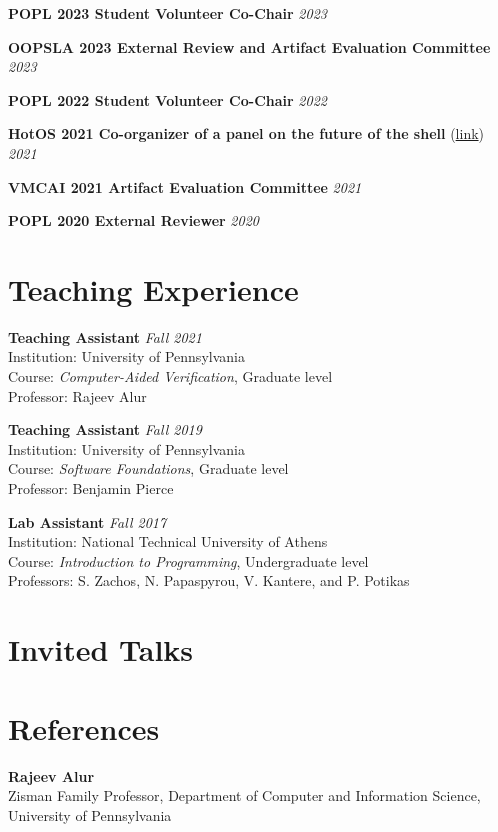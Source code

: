 \documentclass[margin]{res}
\begin{document}
\begin{resume}
\textbf{POPL 2023 Student Volunteer Co-Chair}  \hfill {\em 2023}

\textbf{OOPSLA 2023 External Review and Artifact Evaluation Committee}  \hfill {\em 2023}

\textbf{POPL 2022 Student Volunteer Co-Chair}  \hfill {\em 2022}

\textbf{HotOS 2021 Co-organizer of a panel on the future of the shell} (\href{https://fut-shell.github.io/}{link})  \hfill {\em 2021}

\textbf{VMCAI 2021 Artifact Evaluation Committee}  \hfill {\em 2021}

\textbf{POPL 2020 External Reviewer}  \hfill {\em 2020}

\section{Teaching Experience}

\textbf{Teaching Assistant}  \hfill {\em Fall 2021} \\
Institution: University of Pennsylvania \\
Course: \textit{Computer-Aided Verification}, Graduate level \\
Professor: Rajeev Alur

\textbf{Teaching Assistant}  \hfill {\em Fall 2019} \\
Institution: University of Pennsylvania \\
Course: \textit{Software Foundations}, Graduate level \\
Professor: Benjamin Pierce

\textbf{Lab Assistant}  \hfill {\em Fall 2017} \\
Institution: National Technical University of Athens \\
Course: \textit{Introduction to Programming}, Undergraduate level \\
Professors: S. Zachos, N. Papaspyrou, V. Kantere, and P. Potikas


\section{Invited Talks}



\section{References}

\textbf{Rajeev Alur}\\
Zisman Family Professor, Department of Computer and Information Science, University of Pennsylvania


\end{resume}
\end{document}
